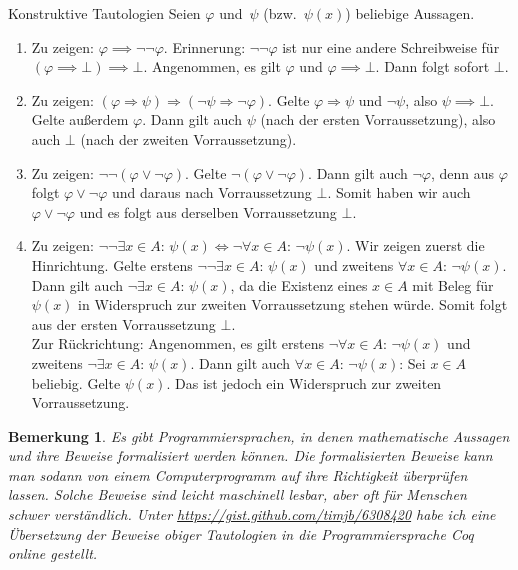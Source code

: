 \documentclass{pizzablatt}
\newtheorem*{bem}{Bemerkung}
\begin{document}
\begin{aufgabe}{Konstruktive Tautologien}
Seien $\varphi$ und~$\psi$ (bzw.~$\psi(x)$) beliebige Aussagen.
\begin{enumerate}
\item Zu zeigen: $\varphi \implies \neg\neg\varphi$. Erinnerung: $\neg\neg\varphi$ ist nur eine andere Schreibweise für $(\varphi \implies \bot) \implies \bot$. Angenommen, es gilt $\varphi$ und $\varphi \implies \bot$. Dann folgt sofort $\bot$.
\item Zu zeigen: $(\varphi \Rightarrow \psi) \Longrightarrow (\neg\psi \Rightarrow
\neg\varphi)$. Gelte $\varphi \Rightarrow \psi$ und $\neg\psi$, also $\psi \implies \bot$. Gelte außerdem $\varphi$. Dann gilt auch $\psi$ (nach der ersten Vorraussetzung), also auch $\bot$ (nach der zweiten Vorraussetzung).
\item Zu zeigen: $\neg\neg(\varphi \vee \neg\varphi)$. Gelte $\neg(\varphi \vee \neg\varphi)$. Dann gilt auch $\neg\varphi$, denn aus $\varphi$ folgt $\varphi \vee \neg\varphi$ und daraus nach Vorraussetzung $\bot$. Somit haben wir auch $\varphi \vee \neg\varphi$ und es folgt aus derselben Vorraussetzung $\bot$.
\item Zu zeigen: $\neg\neg\exists x \in A{:}\, \psi(x) \Longleftrightarrow
  \neg\forall x \in A{:}\, \neg\psi(x)$. Wir zeigen zuerst die Hinrichtung. Gelte erstens $\neg\neg\exists x \in A{:}\, \psi(x)$ und zweitens $\forall x \in A{:}\, \neg\psi(x)$. Dann gilt auch $\neg\exists x \in A{:}\, \psi(x)$, da die Existenz eines $x \in A$ mit Beleg für $\psi(x)$ in Widerspruch zur zweiten Vorraussetzung stehen würde. Somit folgt aus der ersten Vorraussetzung $\bot$.\\
  Zur Rückrichtung: Angenommen, es gilt erstens $\neg\forall x \in A{:}\, \neg\psi(x)$ und zweitens $\neg\exists x \in A{:}\, \psi(x)$. Dann gilt auch $\forall x \in A{:}\, \neg\psi(x)$: Sei $x \in A$ beliebig. Gelte $\psi(x)$. Das ist jedoch ein Widerspruch zur zweiten Vorraussetzung.
\end{enumerate}

\begin{bem}
  Es gibt Programmiersprachen, in denen mathematische Aussagen und ihre Beweise formalisiert werden können. Die formalisierten Beweise kann man sodann von einem Computerprogramm auf ihre Richtigkeit überprüfen lassen. Solche Beweise sind leicht maschinell lesbar, aber oft für Menschen schwer verständlich. Unter \url{https://gist.github.com/timjb/6308420} habe ich eine Übersetzung der Beweise obiger Tautologien in die Programmiersprache \emph{Coq} online gestellt.
\end{bem}
\end{aufgabe}
\end{document}
